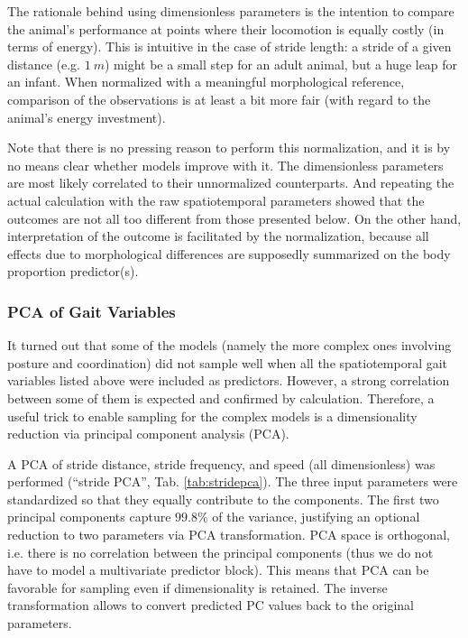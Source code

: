 The rationale behind using dimensionless parameters is the intention to compare the animal's performance at points where their locomotion is equally costly (in terms of energy).
This is intuitive in the case of stride length: a stride of a given distance (e.g. \(1\ m\)) might be a small step for an adult animal, but a huge leap for an infant.
When normalized with a meaningful morphological reference, comparison of the observations is at least a bit more fair (with regard to the animal's energy investment).

Note that there is no pressing reason to perform this normalization, and it is by no means clear whether models improve with it.
The dimensionless parameters are most likely correlated to their unnormalized counterparts.
And repeating the actual calculation with the raw spatiotemporal parameters showed that the outcomes are not all too different from those presented below.
On the other hand, interpretation of the outcome is facilitated by the normalization, because all effects due to morphological differences are supposedly summarized on the body proportion predictor(s).


\subsubsection{PCA of Gait Variables}
\label{prep:stridepca}
It turned out that some of the models (namely the more complex ones involving posture and coordination) did not sample well when all the spatiotemporal gait variables listed above were included as predictors.
However, a strong correlation between some of them is expected and confirmed by calculation.
Therefore, a useful trick to enable sampling for the complex models is a dimensionality reduction via principal component analysis (PCA).

A PCA of stride distance, stride frequency, and speed (all dimensionless) was performed (``stride PCA'', Tab. \ref{tab:stridepca}).
The three input parameters were standardized so that they equally contribute to the components.
The first two principal components capture \(99.8 \%\) of the variance, justifying an optional reduction to two parameters via PCA transformation.
PCA space is orthogonal, i.e. there is no correlation between the principal components (thus we do not have to model a multivariate predictor block).
This means that PCA can be favorable for sampling even if dimensionality is retained.
The inverse transformation allows to convert predicted PC values back to the original parameters.
\bigskip

